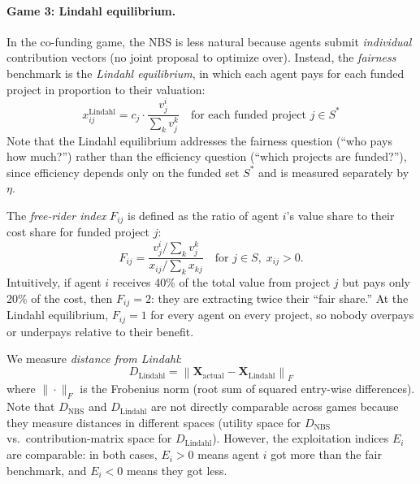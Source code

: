 \paragraph{Game 3: Lindahl equilibrium.}
In the co-funding game, the NBS is less natural because agents submit \emph{individual} contribution vectors (no joint proposal to optimize over).
Instead, the \emph{fairness} benchmark is the \emph{Lindahl equilibrium}, in which each agent pays for each funded project in proportion to their valuation:
\begin{equation}
    x^{\text{Lindahl}}_{ij} = c_j \cdot \frac{v^i_j}{\sum_k v^k_j} \quad \text{for each funded project } j \in S^*
\end{equation}
Note that the Lindahl equilibrium addresses the fairness question (``who pays how much?'') rather than the efficiency question (``which projects are funded?''), since efficiency depends only on the funded set $S^*$ and is measured separately by $\eta$.

The \emph{free-rider index} $F_{ij}$ is defined as the ratio of agent $i$'s value share to their cost share for funded project $j$:
\begin{equation}
    F_{ij} = \frac{v^i_j / \sum_k v^k_j}{x_{ij} / \sum_k x_{kj}} \quad \text{for } j \in S, \; x_{ij} > 0.
\end{equation}
Intuitively, if agent $i$ receives 40\% of the total value from project $j$ but pays only 20\% of the cost, then $F_{ij} = 2$: they are extracting twice their ``fair share.''
At the Lindahl equilibrium, $F_{ij} = 1$ for every agent on every project, so nobody overpays or underpays relative to their benefit.

We measure \emph{distance from Lindahl}:
\begin{equation}
    D_{\text{Lindahl}} = \left\|\bm{X}_{\text{actual}} - \bm{X}_{\text{Lindahl}}\right\|_F
\end{equation}
where $\|\cdot\|_F$ is the Frobenius norm (root sum of squared entry-wise differences).
Note that $D_{\text{NBS}}$ and $D_{\text{Lindahl}}$ are not directly comparable across games because they measure distances in different spaces (utility space for $D_{\text{NBS}}$ vs.\ contribution-matrix space for $D_{\text{Lindahl}}$).
However, the exploitation indices $E_i$ are comparable: in both cases, $E_i > 0$ means agent $i$ got more than the fair benchmark, and $E_i < 0$ means they got less.

